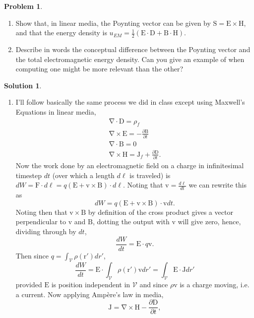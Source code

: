 \documentclass[10pt]{article}
\theoremstyle{definition}
\newtheorem{problem}{Problem}
\newtheorem{soln}{Solution}
\renewcommand{\div}[1]{\bv{\nabla}\cdot #1}
\renewcommand{\curl}[1]{\bv{\nabla}\times #1}
\newcommand{\bv}[1]{\bm{\mathrm{#1}}}
\begin{document}
\begin{problem}~
\begin{enumerate}[label=(\alph*)]
  \item Show that, in linear media, the Poynting vector can be given by $\bv{S}=\bv{E}\times\bv{H}$, and that the energy density is
        $u_{EM}=\frac{1}{2}\left(\bv{E}\cdot\bv{D}+\bv{B}\cdot \bv{H}\right)$.
  \item Describe in words the conceptual difference between the Poynting vector and
        the total electromagnetic energy density. Can you give an example of when
        computing one might be more relevant than the other?
\end{enumerate}
\end{problem}
\begin{soln}~
  \begin{enumerate}[label=(\alph*)]
    \item I'll follow basically the same process we did in class except using Maxwell's Equations in linear media,
          \begin{align*}
            \div{\bv{D}}=\rho_f                               \\
            \curl{\bv{E}}=-\frac{\partial \bv{B}}{\partial t} \\
            \div{\bv{B}}=0                                    \\
            \curl{\bv{H}}=\bv{J}_f+\frac{\partial \bv{D}}{\partial t}.
          \end{align*}
          Now the work done by an electromagnetic field on a charge in infinitesimal timestep $dt$ (over which a length $d\ell$ is traveled)
          is $dW=\bv{F}\cdot d\bv{\ell}=q(\bv{E}+\bv{v}\times\bv{B})\cdot d\ell$. Noting that $\bv{v}=\frac{d\bv{\ell}}{dt}$ we can rewrite this as
          $$dW=q(\bv{E}+\bv{v}\times\bv{B})\cdot \bv{v}dt.$$ Noting then that $\bv{v}\times\bv{B}$ by definition of the cross product
          gives a vector perpendicular to $\bv{v}$ and $\bv{B}$, dotting the output with $\bv{v}$ will give zero, hence, dividing through by $dt$,
          $$\frac{dW}{dt}=\bv{E}\cdot q\bv{v}.$$
          Then since $q=\int_\mathcal{V}\rho(\bv{r}')dr'$,
          $$\frac{dW}{dt}=\bv{E}\cdot \int_\mathcal{V}\rho(\bv{r}')\bv{v}dr'=\int_\mathcal{V}\bv{E}\cdot \bv{J}dr'$$
          provided $\bv{E}$ is position independent in $\mathcal{V}$ and since $\rho \bv{v}$ is a charge moving, i.e. a current.
          Now applying Amp\`ere's law in media,
          $$\bv{J}=\curl{\bv{H}}-\frac{\partial \bv{D}}{\partial t},$$

\end{enumerate}
\end{soln}
\end{document}
